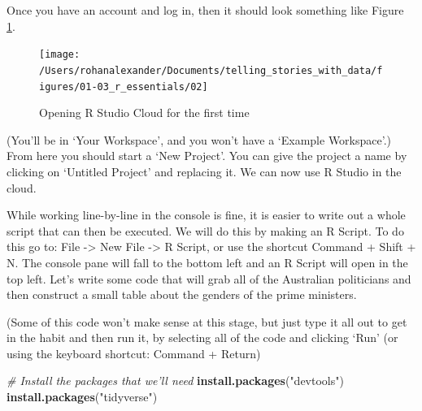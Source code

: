 \documentclass[
]{book}
\newenvironment{Shaded}{\begin{snugshade}}{\end{snugshade}}
\newcommand{\CommentTok}[1]{\textcolor[rgb]{0.56,0.35,0.01}{\textit{#1}}}
\newcommand{\KeywordTok}[1]{\textcolor[rgb]{0.13,0.29,0.53}{\textbf{#1}}}
\newcommand{\NormalTok}[1]{#1}
\newcommand{\OperatorTok}[1]{\textcolor[rgb]{0.81,0.36,0.00}{\textbf{#1}}}
\newcommand{\StringTok}[1]{\textcolor[rgb]{0.31,0.60,0.02}{#1}}
\begin{document}
Once you have an account and log in, then it should look something like Figure \ref{fig:second}.

\begin{figure}
\texttt{[image: /Users/rohanalexander/Documents/telling\_stories\_with\_data/figures/01-03\_r\_essentials/02]} \caption{Opening R Studio Cloud for the first time}\label{fig:second}
\end{figure}

(You'll be in `Your Workspace', and you won't have a `Example Workspace'.) From here you should start a `New Project'. You can give the project a name by clicking on `Untitled Project' and replacing it. We can now use R Studio in the cloud.

While working line-by-line in the console is fine, it is easier to write out a whole script that can then be executed. We will do this by making an R Script. To do this go to: File -\textgreater{} New File -\textgreater{} R Script, or use the shortcut Command + Shift + N. The console pane will fall to the bottom left and an R Script will open in the top left. Let's write some code that will grab all of the Australian politicians and then construct a small table about the genders of the prime ministers.

(Some of this code won't make sense at this stage, but just type it all out to get in the habit and then run it, by selecting all of the code and clicking `Run' (or using the keyboard shortcut: Command + Return)

\begin{Shaded}
\begin{Highlighting}[]
\CommentTok{# Install the packages that we'll need}
\KeywordTok{install.packages}\NormalTok{(}\StringTok{"devtools"}\NormalTok{)}
\KeywordTok{install.packages}\NormalTok{(}\StringTok{"tidyverse"}\NormalTok{)}
\end{Highlighting}
\end{Shaded}

\begin{Shaded}
\end{Shaded}
\end{document}
